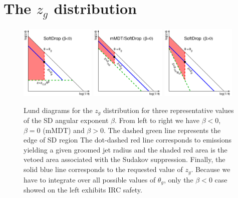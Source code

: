 \section{The $z_g$ distribution} \label{sec:zg}
\begin{figure}
    \centering
    \includegraphics[width=0.32\textwidth]{figures/Lund-SD-zg-negb.pdf}
    \includegraphics[width=0.32\textwidth]{figures/Lund-SD-zg-zerob.pdf}
    \includegraphics[width=0.32\textwidth]{figures/Lund-SD-zg-posb.pdf}
  \caption{Lund diagrams for the $z_g$ distribution for three representative values of the SD angular exponent $\beta$. From left to right we have $\beta<0$, $\beta=0$ (mMDT) and $\beta>0$. 
  The dashed green line
    represents the edge of SD region
     The dot-dashed red line corresponds to
    emissions yielding a given groomed jet radius and the shaded red area is the vetoed area
    associated with the Sudakov suppression. Finally, the solid blue line corresponds to the requested value of $z_g$. Because we have to integrate over all possible values of $\theta_g$, only the $\beta<0$ case showed on the left exhibits IRC safety.
   }\label{fig:lund-sd-zg}
\end{figure}

